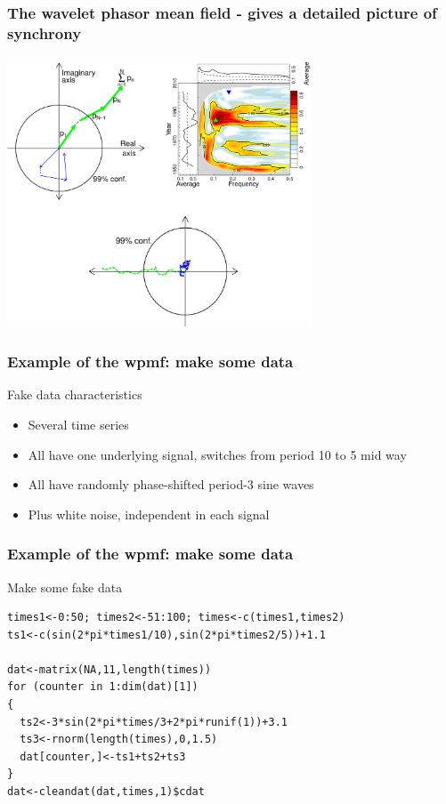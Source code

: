 \documentclass{beamer}
\begin{document}
\begin{frame}
  \frametitle{The wavelet phasor mean field - gives a detailed picture of synchrony}
  \begin{center}
    \includegraphics[height=8cm]{./figures/WPMF.png}
  \end{center}
\end{frame}

\begin{frame}[fragile]
\frametitle{Example of the wpmf: make some data}
\begin{block}{Fake data characteristics}
\begin{itemize}
\item Several time series
\item All have one underlying signal, switches from period 10 to 5 mid way
\item All have randomly phase-shifted period-3 sine waves
\item Plus white noise, independent in each signal
\end{itemize}
\end{block}
\end{frame}

\begin{frame}[fragile]
\frametitle{Example of the wpmf: make some data}
\begin{exampleblock}{Make some fake data}
\begin{verbatim}
times1<-0:50; times2<-51:100; times<-c(times1,times2)
ts1<-c(sin(2*pi*times1/10),sin(2*pi*times2/5))+1.1 

dat<-matrix(NA,11,length(times))
for (counter in 1:dim(dat)[1])
{
  ts2<-3*sin(2*pi*times/3+2*pi*runif(1))+3.1
  ts3<-rnorm(length(times),0,1.5)
  dat[counter,]<-ts1+ts2+ts3    
}
dat<-cleandat(dat,times,1)$cdat
\end{verbatim}
\end{exampleblock}
\end{frame}
\end{document}
